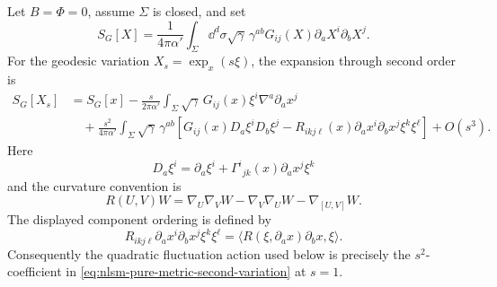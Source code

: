 \begin{proposition}
\label{prop:nlsm-second-variation-curvature-vertex}
Let \(B=\Phi=0\), assume \(\Sigma\) is closed, and set
\[
  S_G[X]
  =
  \frac1{4\pi\alpha'}
  \int_\Sigma\dd^d\sigma\sqrt\gamma\,
  \gamma^{ab}G_{ij}(X)\partial_aX^i\partial_bX^j .
\]
For the geodesic variation \(X_s=\exp_x(s\xi)\), the expansion through
second order is
\begin{equation}
\begin{aligned}
  S_G[X_s]
  &=
  S_G[x]
  -
  \frac{s}{2\pi\alpha'}
  \int_\Sigma\sqrt\gamma\,
  G_{ij}(x)\xi^i\nabla^a\partial_ax^j
  \\
  &\quad
  +
  \frac{s^2}{4\pi\alpha'}
  \int_\Sigma\sqrt\gamma\,\gamma^{ab}
  \left[
    G_{ij}(x)D_a\xi^iD_b\xi^j
    -
    R_{ikj\ell}(x)
    \partial_ax^i\partial_bx^j\xi^k\xi^\ell
  \right]
  +
  O(s^3).
\end{aligned}
  \label{eq:nlsm-pure-metric-second-variation}
\end{equation}
Here
\[
  D_a\xi^i=\partial_a\xi^i+\Gamma^i{}_{jk}(x)\partial_ax^j\xi^k
\]
and the curvature convention is
\begin{equation}
  R(U,V)W
  =
  \nabla_U\nabla_VW-\nabla_V\nabla_UW-\nabla_{[U,V]}W .
  \label{eq:nlsm-curvature-convention-second-variation}
\end{equation}
The displayed component ordering is defined by
\[
  R_{ikj\ell}\partial_ax^i\partial_bx^j\xi^k\xi^\ell
  =
  \langle R(\xi,\partial_ax)\partial_bx,\xi\rangle .
\]
Consequently the quadratic fluctuation action used below is precisely the
\(s^2\)-coefficient in \eqref{eq:nlsm-pure-metric-second-variation} at
\(s=1\).
\end{proposition}

